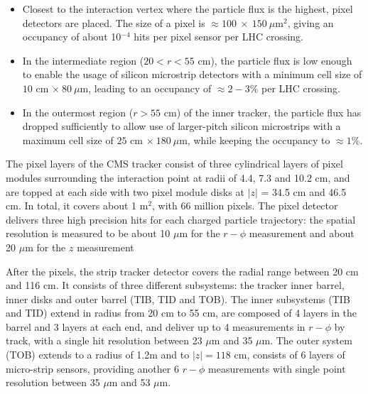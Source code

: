 \begin{itemize}
\item  Closest to the interaction vertex where the particle flux is the highest, pixel detectors are placed. The size of a pixel is $\approx 100~\times~150 ~\mu$m$^{2}$, giving an occupancy of about 10$^{-4}$ hits per pixel sensor per LHC crossing.
\item In the intermediate region ($20 < r < 55$ cm), the particle flux is low enough to enable the usage of silicon microstrip detectors with a minimum cell size of $10$ cm $\times~80~\mu$m, leading to an occupancy of $\approx 2-3\%$ per LHC crossing.
\item In the outermost region ($r > 55$ cm) of the inner tracker, the particle flux has dropped sufficiently to allow use of larger-pitch silicon microstrips with a maximum cell size of $25$ cm $\times~180~\mu$m, while keeping the occupancy to $\approx 1\%$.
\end{itemize}

The pixel layers of the CMS tracker consist of three cylindrical layers of pixel modules surrounding the interaction point at radii of 4.4, 7.3 and 10.2 cm, and are topped at each side with two pixel module disks at $|z|$ = 34.5 cm and 46.5 cm. 
In total, it covers about 1 m$^{2}$, with 66 million pixels. 
The pixel detector delivers three high precision hits for each charged particle trajectory: the spatial resolution is measured to be about 10 $\mu$m for the $r-\phi$ measurement and about 20 $\mu$m for the $z$ measurement

After the pixels, the strip tracker detector covers the radial range between 20 cm and 116 cm. 
It consists of three different subsystems: the tracker inner barrel, inner disks and outer barrel (TIB, TID and TOB). 
The inner subsystems (TIB and TID) extend in radius from 20 cm to 55 cm, are composed of 4 layers in the barrel and 3 layers at each end, and deliver up to 4 measurements in $r-\phi$ by track, with a single hit resolution between 23 $\mu$m and 35 $\mu$m. 
The outer system (TOB) extends to a radius of 1.2m and to $|z| = 118$ cm, consists of 6 layers of micro-strip sensors, providing another 6 $r-\phi$ measurements with single point resolution between 35 $\mu$m and 53 $\mu$m. 

